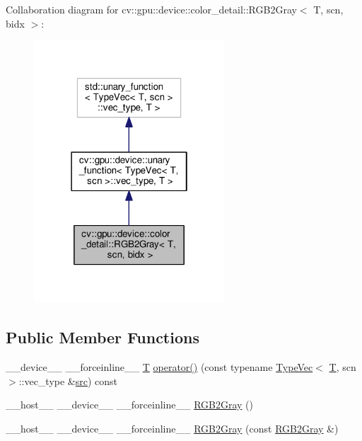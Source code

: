 Collaboration diagram for cv\-:\-:gpu\-:\-:device\-:\-:color\-\_\-detail\-:\-:R\-G\-B2\-Gray$<$ T, scn, bidx $>$\-:\nopagebreak
\begin{figure}[H]
\begin{center}
\leavevmode
\includegraphics[width=202pt]{structcv_1_1gpu_1_1device_1_1color__detail_1_1RGB2Gray__coll__graph}
\end{center}
\end{figure}
\subsection*{Public Member Functions}
\begin{DoxyCompactItemize}
\item 
\-\_\-\-\_\-device\-\_\-\-\_\- \-\_\-\-\_\-forceinline\-\_\-\-\_\- \hyperlink{calib3d_8hpp_a3efb9551a871ddd0463079a808916717}{T} \hyperlink{structcv_1_1gpu_1_1device_1_1color__detail_1_1RGB2Gray_afac8b1cbc6144818868fd3f49ef24a6a}{operator()} (const typename \hyperlink{structcv_1_1gpu_1_1device_1_1TypeVec}{Type\-Vec}$<$ \hyperlink{calib3d_8hpp_a3efb9551a871ddd0463079a808916717}{T}, scn $>$\-::vec\-\_\-type \&\hyperlink{legacy_8hpp_a371cd109b74033bc4366f584edd3dacc}{src}) const 
\item 
\-\_\-\-\_\-host\-\_\-\-\_\- \-\_\-\-\_\-device\-\_\-\-\_\- \-\_\-\-\_\-forceinline\-\_\-\-\_\- \hyperlink{structcv_1_1gpu_1_1device_1_1color__detail_1_1RGB2Gray_a450417f731960f71b57c6843af02f329}{R\-G\-B2\-Gray} ()
\item 
\-\_\-\-\_\-host\-\_\-\-\_\- \-\_\-\-\_\-device\-\_\-\-\_\- \-\_\-\-\_\-forceinline\-\_\-\-\_\- \hyperlink{structcv_1_1gpu_1_1device_1_1color__detail_1_1RGB2Gray_ae9b157aa662470555433665925b9ce5b}{R\-G\-B2\-Gray} (const \hyperlink{structcv_1_1gpu_1_1device_1_1color__detail_1_1RGB2Gray}{R\-G\-B2\-Gray} \&)
\end{DoxyCompactItemize}


